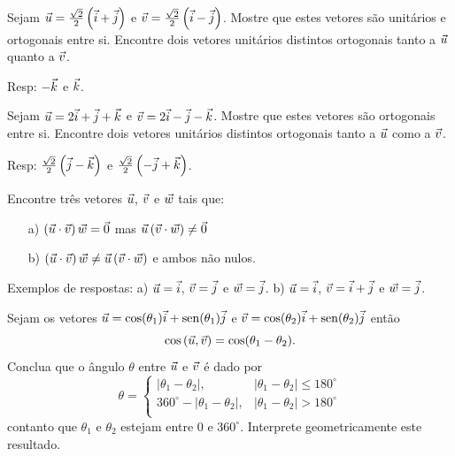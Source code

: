 \begin{prob}\label{exort1}Sejam $\vec{u}=\frac{\sqrt{2}}{2}\left(\vec{i}+\vec{j}\right)$ e $\vec{v}=\frac{\sqrt{2}}{2}\left(\vec{i}-\vec{j}\right)$. Mostre que estes vetores são unitários e ortogonais entre si. Encontre dois vetores unitários distintos ortogonais tanto a $\vec{u}$ quanto a $\vec{v}$.
\end{prob}
Resp: $-\vec{k}$ e $\vec{k}$.

\begin{prob}\label{exort2} Sejam $\vec{u}=2\vec{i}+\vec{j}+\vec{k}$ e $\vec{v}=2\vec{i}-\vec{j}-\vec{k}$. Mostre que estes vetores são ortogonais entre si. Encontre dois vetores unitários distintos ortogonais tanto a  $\vec{u}$ como a $\vec{v}$.
\end{prob}
Resp: $\frac{\sqrt{2}}{2}\left(\vec{j}-\vec{k}\right)$ e $\frac{\sqrt{2}}{2}\left(-\vec{j}+\vec{k}\right)$.

\begin{prob} Encontre três vetores $\vec{u}$, $\vec{v}$ e $\vec{w}$ tais que:
\begin{itemize}
\item [a)] $\left(\vec{u}\cdot\vec{v}\right)\vec{w}=\vec{0}$ mas $\vec{u}\left(\vec{v}\cdot\vec{w}\right)\neq \vec{0}$ 
\item [b)] $\left(\vec{u}\cdot\vec{v}\right)\vec{w}\neq \vec{u}\left(\vec{v}\cdot\vec{w}\right)$ e ambos não nulos. 
\end{itemize}
\end{prob}

Exemplos de respostas: a) $\vec{u}=\vec{i}$, $\vec{v}=\vec{j}$ e $\vec{w}=\vec{j}$. b) $\vec{u}=\vec{i}$, $\vec{v}=\vec{i}+\vec{j}$ e $\vec{w}=\vec{j}$.

\begin{prob} Sejam os vetores $\vec{u}=\cos(\theta_1)\vec{i}+\operatorname{sen}(\theta_1)\vec{j}$ e $\vec{v}=\cos(\theta_2)\vec{i}+\operatorname{sen}(\theta_2)\vec{j}$ então
$$\cos\left(\vec{u},\vec{v}\right)=\cos(\theta_1-\theta_2).$$
Conclua que o ângulo $\theta$ entre $\vec{u}$ e $\vec{v}$ é dado por
$$\theta=\left\{
\begin{array}{ll}
|\theta_1-\theta_2|,& |\theta_1-\theta_2|\leq 180^\circ\\
360^\circ-|\theta_1-\theta_2|,& |\theta_1-\theta_2|> 180^\circ\\
\end{array}
\right.$$ 
contanto que $\theta_1$ e $\theta_2$ estejam entre $0$ e $360^\circ$.
Interprete geometricamente este resultado.
\end{prob}

